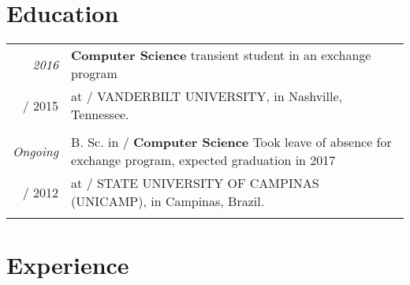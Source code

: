 \documentclass[a4paper,10pt]{article}
\makeatletter
\def\fakesc#1{%
  \begingroup%
  \xdef\fake@name{\csname\curr@fontshape/\f@size\endcsname}%
  \fontsize{\fontdimen8\fake@name}{\baselineskip}\selectfont%
  \uppercase{#1}%
  \endgroup%
}
\renewcommand{\textsc}{\fakesc}
\makeatother
\begin{document}
\section{Education}

\begin{tabularx}{\textwidth}{r|X}	

  \emph{2016} & \textsc{}\textbf{Computer Science} transient student in an exchange program  \\
  \textsc{2015} & at \textsc{Vanderbilt University,} \footnotesize{in Nashville, Tennessee.}\\
  \multicolumn{2}{c}{}\\

  \emph{Ongoing} & B. Sc. in \textsc{}\textbf{Computer Science} {\tiny Took leave of absence for exchange program, expected graduation in 2017} \\
  \textsc{2012} & at \textsc{State University of Campinas (Unicamp),} \footnotesize{in Campinas, Brazil.}\\
  \multicolumn{2}{c}{}\\

\end{tabularx}

\section{Experience}
\end{document}
